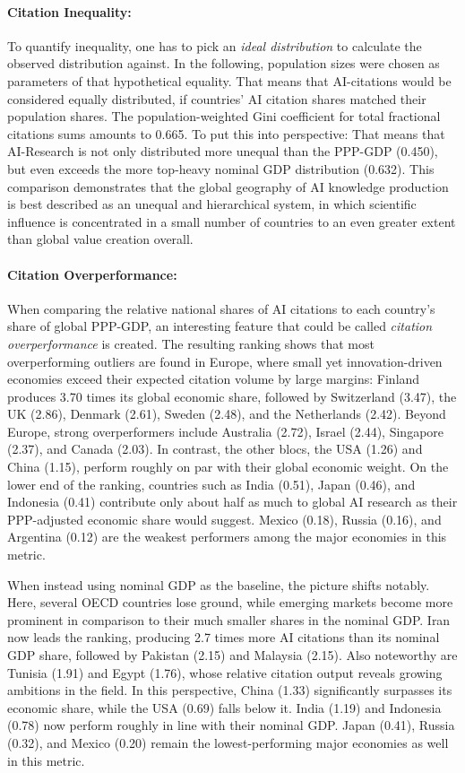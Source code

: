 \documentclass{article}
\begin{document}
	\paragraph{Citation Inequality:} To quantify inequality, one has to pick an \textit{ideal distribution} to calculate the observed distribution against. In the following, population sizes were chosen as parameters of that hypothetical equality. That means that AI-citations would be considered equally distributed, if countries' AI citation shares matched their population shares. The population-weighted Gini coefficient for total fractional citations sums amounts to 0.665. To put this into perspective: That means that AI-Research is not only distributed more unequal than the PPP-GDP (0.450), but even exceeds the more top-heavy nominal GDP distribution (0.632). This comparison demonstrates that the global geography of AI knowledge production is best described as an unequal and hierarchical system, in which scientific influence is concentrated in a small number of countries to an even greater extent than global value creation overall.
	
	\paragraph{Citation Overperformance:} When comparing the relative national shares of AI citations to each country’s share of global PPP-GDP, an interesting feature that could be called \textit{citation overperformance} is created. The resulting ranking shows that most overperforming outliers are found in Europe, where small yet innovation-driven economies exceed their expected citation volume by large margins: Finland produces 3.70 times its global economic share, followed by Switzerland (3.47), the UK (2.86), Denmark (2.61), Sweden (2.48), and the Netherlands (2.42). Beyond Europe, strong overperformers include Australia (2.72),  Israel (2.44), Singapore (2.37), and Canada (2.03). In contrast, the other blocs, the USA (1.26) and China (1.15), perform roughly on par with their global economic weight. On the lower end of the ranking, countries such as India (0.51), Japan (0.46), and Indonesia (0.41) contribute only about half as much to global AI research as their PPP-adjusted economic share would suggest. Mexico (0.18), Russia (0.16), and Argentina (0.12) are the weakest performers among the major economies in this metric.
	
	When instead using nominal GDP as the baseline, the picture shifts notably. Here, several OECD countries lose ground, while emerging markets become more prominent in comparison to their much smaller shares in the nominal GDP. Iran now leads the ranking, producing 2.7 times more AI citations than its nominal GDP share, followed by Pakistan (2.15) and Malaysia (2.15). Also noteworthy are Tunisia (1.91) and Egypt (1.76), whose relative citation output reveals growing ambitions in the field. In this perspective, China (1.33) significantly surpasses its economic share, while the USA (0.69) falls below it. India (1.19) and Indonesia (0.78) now perform roughly in line with their nominal GDP. Japan (0.41), Russia (0.32), and Mexico (0.20) remain the lowest-performing major economies as well in this metric. 
	
\end{document}
